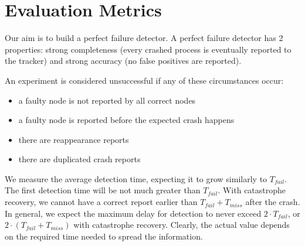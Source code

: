 \section{Evaluation Metrics}
\label{sec:metrics}

Our aim is to build a perfect failure detector.
A perfect failure detector has 2 properties: strong completeness (every crashed process is eventually reported to the tracker) and strong accuracy (no false positives are reported).

An experiment is considered unsuccessful if any of these circumstances occur:
\begin{itemize}
    \item a faulty node is not reported by all correct nodes
    \item a faulty node is reported before the expected crash happens
    \item there are reappearance reports
    \item there are duplicated crash reports
\end{itemize}

We measure the average detection time, expecting it to grow similarly to $T_{fail}$.
The first detection time will be not much greater than $T_{fail}$.
With catastrophe recovery, we cannot have a correct report earlier than $T_{fail} + T_{miss}$ after the crash.
In general, we expect the maximum delay for detection to never exceed $2 \cdot T_{fail}$, or $2 \cdot (T_{fail} + T_{miss})$ with catastrophe recovery.
Clearly, the actual value depends on the required time needed to spread the information. 
